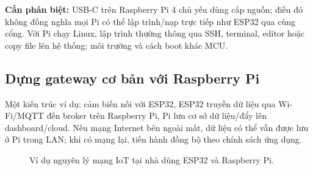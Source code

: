 \begin{tipbox}
\textbf{Cần phân biệt:} USB-C trên Raspberry Pi 4 chủ yếu dùng cấp nguồn; điều đó không đồng nghĩa mọi Pi có thể lập trình/nạp trực tiếp như ESP32 qua cùng cổng. Với Pi chạy Linux, lập trình thường thông qua SSH, terminal, editor hoặc copy file lên hệ thống; môi trường và cách boot khác MCU.
\end{tipbox}

\subsection{Dựng gateway cơ bản với Raspberry Pi}
Một kiến trúc ví dụ: cảm biến nối với ESP32, ESP32 truyền dữ liệu qua Wi-Fi/MQTT đến broker trên Raspberry Pi, Pi lưu cơ sở dữ liệu/đẩy lên dashboard/cloud. Nếu mạng Internet bên ngoài mất, dữ liệu có thể vẫn được lưu ở Pi trong LAN; khi có mạng lại, tiến hành đồng bộ theo chính sách ứng dụng.

\begin{figure}[htbp]\centering
{}
\caption{Ví dụ nguyên lý mạng IoT tại nhà dùng ESP32 và Raspberry Pi.}
\end{figure}

